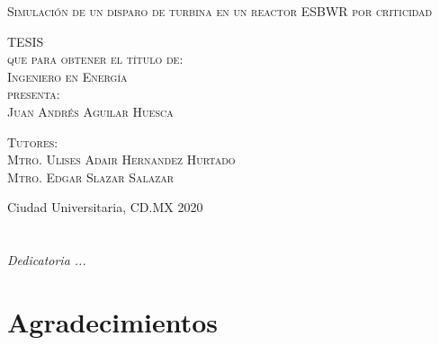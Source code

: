 \documentclass[letterpaper,12pt,oneside]{book}
\begin{document}
\begin{titlepage}
\begin{minipage}[c][0.81\textheight][t]{0.75\textwidth}
\begin{center}
                {\large\scshape Simulación de un disparo de turbina en un reactor ESBWR por criticidad}\\[.2in]

                \vspace{2cm}            

                \textsc{\LARGE T\hspace{1.5cm}E\hspace{1.5cm}S\hspace{1.5cm}I\hspace{1.5cm}S}\\[0.5cm]
                \textsc{\large que para obtener el t\'itulo de:}\\[0.5cm]
                \textsc{\large Ingeniero en Energía}\\[0.5cm]
                \textsc{\large presenta:}\\[0.5cm]
                \textsc{\large {Juan Andrés Aguilar Huesca}}\\[2cm]          

                \vspace{0.5cm}

                {\large\scshape Tutores:\\[0.3cm] {Mtro. Ulises  Adair Hernandez Hurtado \\ 
Mtro. Edgar Slazar Salazar}}\\[.2in]

                \vspace{0.5cm}

                \large{Ciudad Universitaria, CD.MX}{ }{2020}
            \end{center}
        \end{minipage}
    \end{titlepage}



\frontmatter
\chapter*{}
\begin{flushright}%
  \emph{Dedicatoria ...}
  \thispagestyle{empty}
\end{flushright}

\chapter{Agradecimientos}
\end{document}
